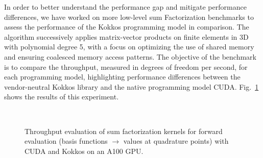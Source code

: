 \documentclass[a4paper,12pt]{article}
\begin{document}
In order to better understand the performance gap and mitigate performance
differences, we have worked on more low-level sum Factorization benchmarks to
assess the performance of the Kokkos programming model in comparison. The
algorithm successively applies matrix-vector products on finite elements in 3D
with polynomial degree 5, with a focus on optimizing the use of shared memory
and ensuring coalesced memory access patterns. The objective of the benchmark
is to compare the throughput, measured in degrees of freedom per second, for
each programming model, highlighting performance differences between the
vendor-neutral Kokkos library and the native programming model
CUDA. Fig.~\ref{fig:sum_fact} shows the results of this experiment.

\begin{figure}
  \centering
  \\
  \strut\hfill{}\hfill\strut
  \caption{Throughput evaluation of sum factorization kernels for forward evaluation (basis functions $\to$ values at quadrature points) with CUDA and Kokkos on an A100 GPU.}
  \label{fig:sum_fact}
\end{figure}
\end{document}
